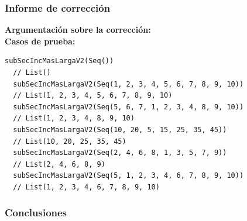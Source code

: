\documentclass[12pt, a4paper]{article}
\begin{document}
\subsubsection{Informe de corrección}
\textbf{Argumentación sobre la corrección: \\}
\textbf{Casos de prueba: \\}
\begin{lstlisting}[caption=Casos de prueba para la función subSecIncMasLargaV2, label=lst:scala_code]
  subSecIncMasLargaV2(Seq())
  // List()
  subSecIncMasLargaV2(Seq(1, 2, 3, 4, 5, 6, 7, 8, 9, 10)) 
  // List(1, 2, 3, 4, 5, 6, 7, 8, 9, 10)
  subSecIncMasLargaV2(Seq(5, 6, 7, 1, 2, 3, 4, 8, 9, 10))  
  // List(1, 2, 3, 4, 8, 9, 10)
  subSecIncMasLargaV2(Seq(10, 20, 5, 15, 25, 35, 45))  
  // List(10, 20, 25, 35, 45)
  subSecIncMasLargaV2(Seq(2, 4, 6, 8, 1, 3, 5, 7, 9))  
  // List(2, 4, 6, 8, 9)
  subSecIncMasLargaV2(Seq(5, 1, 2, 3, 4, 6, 7, 8, 9, 10))
  // List(1, 2, 3, 4, 6, 7, 8, 9, 10)
\end{lstlisting}
\subsubsection{Conclusiones}
\end{document}
